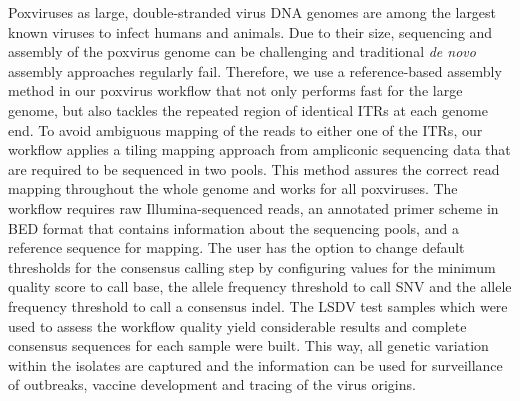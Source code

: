 Poxviruses as large, double-stranded virus \ac{DNA} genomes are among the largest known viruses to infect humans and animals. Due to their size, sequencing and assembly of the poxvirus genome can be challenging and traditional \textit{de novo} assembly approaches regularly fail. Therefore, we use a reference-based assembly method in our poxvirus workflow that not only performs fast for the large genome, but also tackles the repeated region of identical \acp{ITR} at each genome end. To avoid ambiguous mapping of the reads to either one of the \acp{ITR}, our workflow applies a tiling mapping approach from ampliconic sequencing data that are required to be sequenced in two pools. This method assures the correct read mapping throughout the whole genome and works for all poxviruses. The workflow requires raw Illumina-sequenced reads, an annotated primer scheme in \ac{BED} format that contains information about the sequencing pools, and a reference sequence for mapping. The user has the option to change default thresholds for the consensus calling step by configuring values for the minimum quality score to call base, the allele frequency threshold to call \ac{SNV} and the allele frequency threshold to call a consensus indel. The \ac{LSDV} test samples which were used to assess the workflow quality yield considerable results and complete consensus sequences for each sample were built. This way, all genetic variation within the isolates are captured and the information can be used for surveillance of outbreaks, vaccine development and tracing of the virus origins. 

